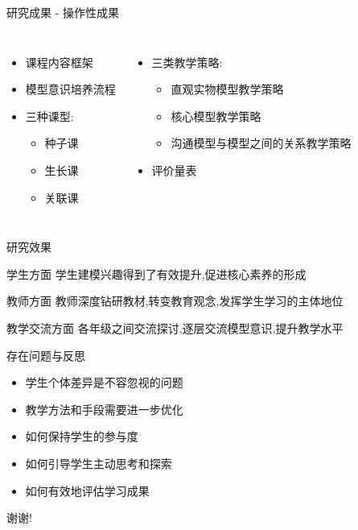 \documentclass{beamer}
\begin{document}
\begin{frame}{研究成果 - 操作性成果}
	\begin{columns}[t]
		\begin{itemize}
			\item 课程内容框架
			\item 模型意识培养流程
			\item 三种课型:
			      \begin{itemize}
				      \item 种子课
				      \item 生长课
				      \item 关联课
			      \end{itemize}
		\end{itemize}

		\begin{itemize}
			\item 三类教学策略:
			      \begin{itemize}
				      \item 直观实物模型教学策略
				      \item 核心模型教学策略
				      \item 沟通模型与模型之间的关系教学策略
			      \end{itemize}
			\item 评价量表
		\end{itemize}
	\end{columns}
\end{frame}

\begin{frame}{研究效果}
	\begin{block}{学生方面}
		学生建模兴趣得到了有效提升,促进核心素养的形成
	\end{block}
	\begin{block}{教师方面}
		教师深度钻研教材,转变教育观念,发挥学生学习的主体地位
	\end{block}
	\begin{block}{教学交流方面}
		各年级之间交流探讨,逐层交流模型意识,提升教学水平
	\end{block}
\end{frame}

\begin{frame}{存在问题与反思}
	\begin{itemize}
		\item 学生个体差异是不容忽视的问题
		\item 教学方法和手段需要进一步优化
		\item 如何保持学生的参与度
		\item 如何引导学生主动思考和探索
		\item 如何有效地评估学习成果
	\end{itemize}
\end{frame}

\begin{frame}
	\begin{center}
		\Huge 谢谢!
	\end{center}
\end{frame}
\end{document}
